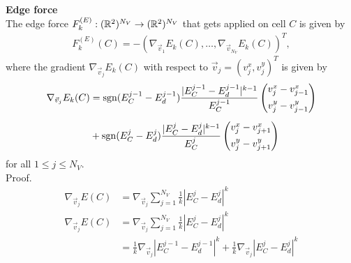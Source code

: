 \begin{proposition} \textbf{Edge force} \\

	The edge force $F_{k}^{(E)}: (\mathbb{R}^2)^{N_V} \rightarrow (\mathbb{R}^2)^{N_V}$ that gets applied on cell $C$ is given by  
	\begin{align*}
		F_{k}^{(E)}(C) 
		= - (\nabla_{\vec{v}_1} E_k(C), \ldots, \nabla_{\vec{v}_{N_V}} E_k(C))^T,
	\end{align*}
	where the gradient $\nabla_{\vec{v}_j} E_k(C)$ with respect to $\vec{v}_j = (v_{j}^{x}, v_{j}^{y})^T$ is given by 
	\begin{align}
		\begin{split}
			\nabla_{\vec{v}_j} E_k(C) &= \operatorname{sgn}(E^{j-1}_{C}- E_d^{j-1}) \dfrac{|E^{j-1}_{C}- E_d^{j-1}|^{k-1}}{E^{j-1}_{C}}  
			\begin{pmatrix} v_{j}^{x} - v_{j-1}^{x} \\[0.5em]  v_{j}^{y} - v_{j-1}^{y}  \end{pmatrix} \\[0.5em]
			&+ \operatorname{sgn}(E^j_{C} - E_d^{j}) \dfrac{|E^j_{C} - E_d^{j}|^{k-1}}{E^j_{C}}  
			\begin{pmatrix} v_{j}^{x} - v_{j+1}^{x} \\[0.5em]  v_{j}^{y} - v_{j+1}^{y} \end{pmatrix}
		\end{split}
		\label{gradient:edge}
	\end{align}
	for all $1 \leq j \leq N_V$.\\

	Proof. \\

	\begin{align*}
		\nabla_{\vec{v}_{j}} E(C) &= \nabla_{\vec{v}_{j}} \sum\limits_{j=1}^{N_V} \frac{1}{k} |E^j_{C} - E^{j}_d|^k \\
		\nabla_{\vec{v}_{j}} E(C) &= \nabla_{\vec{v}_{j}} \sum\limits_{j=1}^{N_V} \frac{1}{k} |E^j_{C} - E^{j}_d|^k \\
		&= \frac{1}{k} \nabla_{\vec{v}_{j}} |E^{j-1}_{C} - E^{j-1}_d|^k + \frac{1}{k}\nabla_{\vec{v}_{j}} |E^j_{C} - E^{j}_d|^k 
	\end{align*}


\end{proposition}
